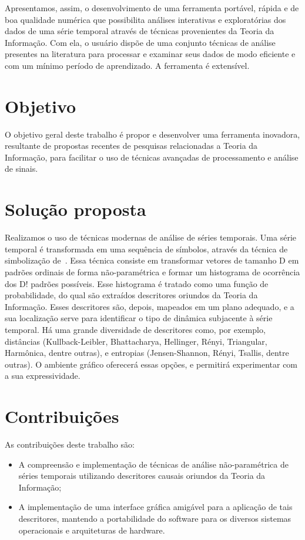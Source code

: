 Apresentamos, assim, o desenvolvimento de uma ferramenta portável, rápida e de boa qualidade numérica que possibilita análises interativas e exploratórias dos dados de uma série temporal através de técnicas provenientes da Teoria da Informação.
Com ela, o usuário dispõe de uma conjunto técnicas de análise presentes na literatura para processar e examinar seus dados de modo eficiente e com um mínimo período de aprendizado.
A ferramenta é extensível.

\section{Objetivo}

O objetivo geral deste trabalho é propor e desenvolver uma ferramenta inovadora, resultante de propostas recentes de pesquisas relacionadas a Teoria da Informação, para facilitar o uso de técnicas avançadas de processamento e análise de sinais.

\section{Solução proposta}

Realizamos o uso de técnicas modernas de análise de séries temporais. Uma série temporal é transformada em uma sequência de símbolos, através da técnica de simbolização de~\cite{article2}. Essa técnica consiste em transformar vetores de tamanho D em padrões ordinais de forma não-paramétrica e formar um histograma de ocorrência dos D! padrões possíveis. Esse histograma é tratado como uma função de probabilidade, do qual são extraídos descritores oriundos da Teoria da Informação. Esses descritores são, depois, mapeados em um plano adequado, e a sua localização serve para identificar o tipo de dinâmica subjacente à série temporal. Há uma grande diversidade de descritores como, por exemplo, distâncias (Kullback-Leibler, Bhattacharya, Hellinger, Rényi, Triangular, Harmônica, dentre outras), e entropias (Jensen-Shannon, Rényi, Tsallis, dentre outras). O ambiente gráfico oferecerá essas opções, e permitirá experimentar com a sua expressividade.

\section{Contribuições}

As contribuições deste trabalho são:

\begin{itemize}
\item A compreensão e implementação de técnicas de análise não-paramétrica de séries temporais utilizando descritores causais oriundos da Teoria da Informação;
\item A implementação de uma interface gráfica amigável para a aplicação de tais descritores, mantendo a portabilidade do software para os diversos sistemas operacionais e arquiteturas de hardware.
\end{itemize}

